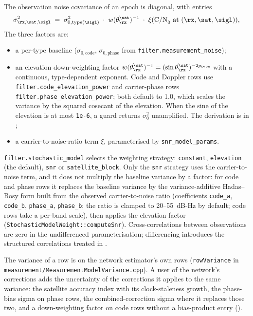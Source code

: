 The observation noise covariance of an epoch is diagonal, with entries
\begin{equation}
\sigma^2_{\rx,\sat,\sigl}
\;=\;
\sigma^2_{0,\text{type}(\sigl)}\;\cdot\; w(\theta^\sat_\rx)^{-1}\;\cdot\;
\xi(\text{C/N}_0\text{ at } (\rx,\sat,\sigl)),
\label{eq:noise-model}
\end{equation}
The three factors are:
\begin{itemize}[leftmargin=*, itemsep=0pt]
\item a per-type baseline ($\sigma_{0,\text{code}}$,
      $\sigma_{0,\text{phase}}$ from \texttt{filter.measurement\_noise});
\item an elevation down-weighting factor
      $w(\theta^\sat_\rx)^{-1} = (\sin\theta^\sat_\rx)^{-2p_{\text{type}}}$
      with a continuous, type-dependent exponent.  Code and Doppler rows
      use \texttt{filter.code\_elevation\_power} and carrier-phase rows
      \texttt{filter.phase\_elevation\_power}; both default to 1.0, which
      scales the variance by the squared cosecant of the elevation.  When
      the sine of the elevation is at most \texttt{1e-6}, a guard returns
      $\sigma^2_0$ unamplified.  The derivation is in
      ;
\item a carrier-to-noise-ratio term $\xi$, parameterised by
      \texttt{snr\_model\_params}.
\end{itemize}
\texttt{filter.stochastic\_model} selects the weighting strategy:
\texttt{constant}, \texttt{elevation} (the default), \texttt{snr} or
\texttt{satellite\_block}.  Only the \texttt{snr} strategy uses the
carrier-to-noise term, and it does not multiply the baseline variance by
a factor: for code and phase rows it replaces the baseline variance by
the variance-additive Hadas--Bosy form built from the observed
carrier-to-noise ratio (coefficients \texttt{code\_a}, \texttt{code\_b},
\texttt{phase\_a}, \texttt{phase\_b}; the ratio is clamped to
20--55~dB-Hz by default; code rows take a per-band scale), then applies
the elevation factor
(\texttt{StochasticModelWeight::computeSnr}).  Cross-correlations between
observations are zero in the undifferenced parameterisation; differencing
introduces the structured correlations treated in .

The variance of a row is  on the network estimator's
own rows (\texttt{rowVariance} in
\texttt{measurement/MeasurementModelVariance.cpp}).  A user of the network's
corrections adds the uncertainty of the corrections it applies to the same
variance: the satellite accuracy index with its clock-staleness growth, the
phase-bias sigma on phase rows, the combined-correction sigma where it
replaces those two, and a down-weighting factor on code rows without a
bias-product entry ().
